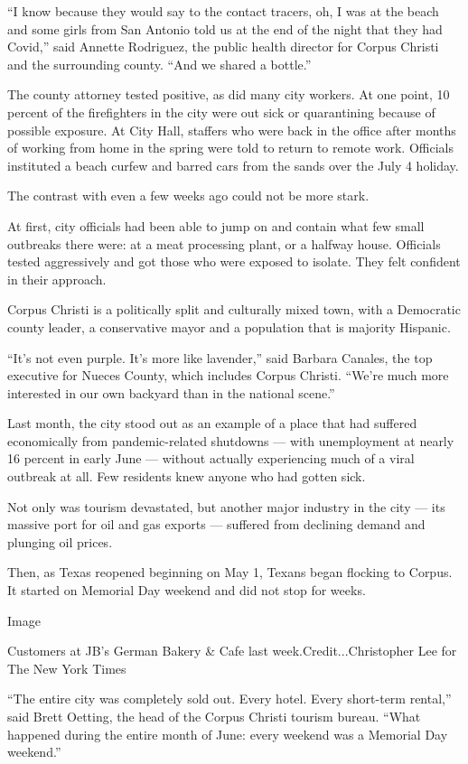 ``I know because they would say to the contact tracers, oh, I was at the
beach and some girls from San Antonio told us at the end of the night
that they had Covid,'' said Annette Rodriguez, the public health
director for Corpus Christi and the surrounding county. ``And we shared
a bottle.''

The county attorney tested positive, as did many city workers. At one
point, 10 percent of the firefighters in the city were out sick or
quarantining because of possible exposure. At City Hall, staffers who
were back in the office after months of working from home in the spring
were told to return to remote work. Officials instituted a beach curfew
and barred cars from the sands over the July 4 holiday.

The contrast with even a few weeks ago could not be more stark.

At first, city officials had been able to jump on and contain what few
small outbreaks there were: at a meat processing plant, or a halfway
house. Officials tested aggressively and got those who were exposed to
isolate. They felt confident in their approach.

Corpus Christi is a politically split and culturally mixed town, with a
Democratic county leader, a conservative mayor and a population that is
majority Hispanic.

``It's not even purple. It's more like lavender,'' said Barbara Canales,
the top executive for Nueces County, which includes Corpus Christi.
``We're much more interested in our own backyard than in the national
scene.''

Last month, the city stood out as an example of a place that had
suffered economically from pandemic-related shutdowns --- with
unemployment at nearly 16 percent in early June --- without actually
experiencing much of a viral outbreak at all. Few residents knew anyone
who had gotten sick.

Not only was tourism devastated, but another major industry in the city
--- its massive port for oil and gas exports --- suffered from declining
demand and plunging oil prices.

Then, as Texas reopened beginning on May 1, Texans began flocking to
Corpus. It started on Memorial Day weekend and did not stop for weeks.

Image

Customers at JB's German Bakery \& Cafe last week.Credit...Christopher
Lee for The New York Times

``The entire city was completely sold out. Every hotel. Every short-term
rental,'' said Brett Oetting, the head of the Corpus Christi tourism
bureau. ``What happened during the entire month of June: every weekend
was a Memorial Day weekend.''

